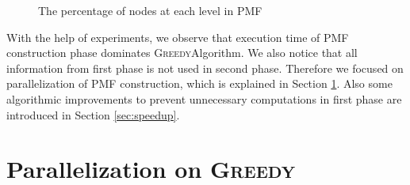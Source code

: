 \documentclass[12pt]{article}
\newcommand{\comment}[2]{{\color{red}{\bf (#1: #2)}}}
\newcommand{\greedyAlgo}{\textsc{Greedy}}
\begin{document}
\begin{figure}[ht]
	\centering
	\caption{The percentage of nodes at each level in PMF \comment{sertac}{distance yerine length yazmak lazim. Daha okunabilir ve diger graphlerle uyumlu bir halini yapmak icin graphlerin exceldeki hallerini bulmam lazim}}
	\label{fig:nodes-at-levels}
	\vspace*{-2.5ex}
\end{figure}


With the help of experiments, we observe that execution time of PMF construction phase dominates \greedyAlgo \space Algorithm. We also notice that all information from first phase is not used in second phase. Therefore we focused on parallelization of PMF construction, which is explained in Section \ref{sec:parallel}. Also some algorithmic improvements to prevent unnecessary computations in first phase are introduced in Section \ref{sec:speedup}.

\clearpage
\section{Parallelization on \greedyAlgo}
\label{sec:parallel}
\end{document}
